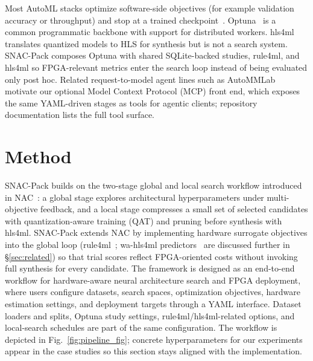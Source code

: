 \documentclass[11pt]{article}
\begin{document}
Most AutoML stacks optimize software-side objectives (for example validation accuracy or throughput) and stop at a trained checkpoint~\citep{feurer2015efficient,jin2023autokeras,zimmer2021auto,wang2021flaml,tang2024autogluon}.
Optuna~\citep{optuna_2019} is a common programmatic backbone with support for distributed workers.
hls4ml translates quantized models to HLS for synthesis but is not a search system.
SNAC-Pack composes Optuna with shared SQLite-backed studies, rule4ml, and hls4ml so FPGA-relevant metrics enter the search loop instead of being evaluated only post hoc.
Related request-to-model agent lines such as AutoMMLab~\citep{yang2025autommlab} motivate our optional Model Context Protocol (MCP) front end, which exposes the same YAML-driven stages as tools for agentic clients; repository documentation lists the full tool surface.

\section{Method}
\label{sec:method}
SNAC-Pack builds on the two-stage global and local search workflow introduced in NAC~\citep{Weitz_2025}: a global stage explores architectural hyperparameters under multi-objective feedback, and a local stage compresses a small set of selected candidates with quantization-aware training (QAT) and pruning before synthesis with hls4ml.
SNAC-Pack extends NAC by implementing hardware surrogate objectives into the global loop (rule4ml~\citep{Rahimifar_2025}; wa-hls4ml predictors~\citep{hawks2025wahls4mlbenchmarksurrogatemodels} are discussed further in \S\ref{sec:related}) so that trial scores reflect FPGA-oriented costs without invoking full synthesis for every candidate.
The framework is designed as an end-to-end workflow for hardware-aware neural architecture search and FPGA deployment, where users configure datasets, search spaces, optimization objectives, hardware estimation settings, and deployment targets through a YAML interface.
Dataset loaders and splits, Optuna study settings, rule4ml/hls4ml-related options, and local-search schedules are part of the same configuration.
The workflow is depicted in Fig.~\ref{fig:pipeline_fig}; concrete hyperparameters for our experiments appear in the case studies so this section stays aligned with the implementation.
\end{document}
